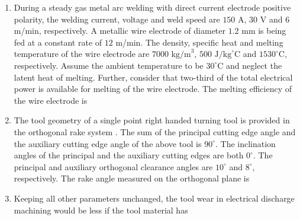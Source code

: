 \documentclass[journal,12pt,onecolumn]{IEEEtran}
\theoremstyle{remark}
\begin{document}
\begin{enumerate}
\item During a steady gas metal arc welding with direct current electrode positive polarity, the welding current, voltage and weld speed are $150$ A, $30$ V and $6$ m/min, respectively. A metallic wire electrode of diameter $1.2$ mm is being fed at a constant rate of $12$ m/min. The density, specific heat and melting temperature of the wire electrode are $7000 \text{ kg/m}^3$, $500 \text{ J/kg}^{\circ}\text{C}$ and $1530^{\circ}\text{C}$, respectively. Assume the ambient temperature to be $30^{\circ}\text{C}$ and neglect the latent heat of melting. Further, consider that two-third of the total electrical power is available for melting of the wire electrode. The melting efficiency  of the wire electrode is
\hfill{}
\begin{enumerate}
\end{enumerate}

\item The tool geometry of a single point right handed turning tool is provided in the orthogonal rake system . The sum of the principal  cutting edge angle and the auxiliary  cutting edge angle of the above tool is $90^{\circ}$. The inclination angles of the principal and the auxiliary cutting edges are both $0^{\circ}$. The principal and auxiliary orthogonal clearance angles are $10^{\circ}$ and $8^{\circ}$, respectively. The rake angle  measured on the orthogonal plane is
\hfill{}
\begin{enumerate}
\end{enumerate}

\item Keeping all other parameters unchanged, the tool wear in electrical discharge machining  would be less if the tool material has
\hfill{}
\begin{enumerate}
\end{enumerate}


\end{enumerate}
\end{document}
